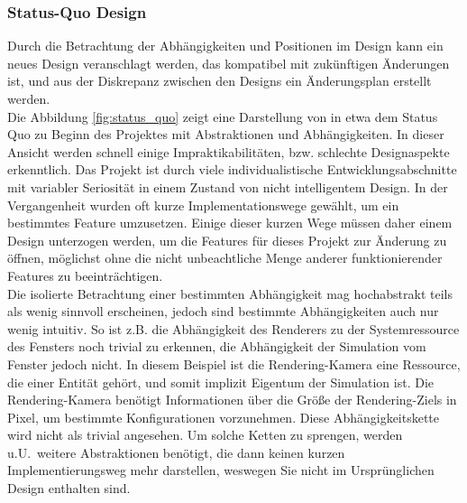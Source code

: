 \subsubsection{Status-Quo Design}
Durch die Betrachtung der Abhängigkeiten und Positionen im Design kann ein neues Design veranschlagt werden, das kompatibel mit zukünftigen Änderungen ist, und aus der Diskrepanz zwischen den Designs ein Änderungsplan erstellt werden.\\

Die Abbildung \ref{fig:status_quo} zeigt eine Darstellung von in etwa dem Status Quo zu Beginn des Projektes mit Abstraktionen und Abhängigkeiten.
In dieser Ansicht werden schnell einige Impraktikabilitäten, bzw. schlechte Designaspekte erkenntlich.
Das Projekt ist durch viele individualistische Entwicklungsabschnitte mit variabler Seriosität in einem Zustand von nicht intelligentem Design. 
In der Vergangenheit wurden oft kurze Implementationswege gewählt, um ein bestimmtes Feature umzusetzen. Einige dieser kurzen Wege müssen daher einem Design unterzogen werden, um die Features für dieses Projekt zur Änderung zu öffnen, möglichst ohne die nicht unbeachtliche Menge anderer funktionierender Features zu beeinträchtigen.\\
Die isolierte Betrachtung einer bestimmten Abhängigkeit mag hochabstrakt teils als wenig sinnvoll erscheinen, jedoch sind bestimmte Abhängigkeiten auch nur wenig intuitiv. So ist z.B. die Abhängigkeit des Renderers zu der Systemressource des Fensters noch trivial zu erkennen, die Abhängigkeit der Simulation vom Fenster jedoch nicht. In diesem Beispiel ist die Rendering-Kamera eine Ressource, die einer Entität gehört, und somit implizit Eigentum der Simulation ist. Die Rendering-Kamera benötigt Informationen über die Größe der Rendering-Ziels in Pixel, um bestimmte Konfigurationen vorzunehmen. Diese Abhängigkeitskette wird nicht als trivial angesehen. Um solche Ketten zu sprengen, werden u.U.~weitere Abstraktionen benötigt, die dann keinen kurzen Implementierungsweg mehr darstellen, weswegen Sie nicht im Ursprünglichen Design enthalten sind.\\

